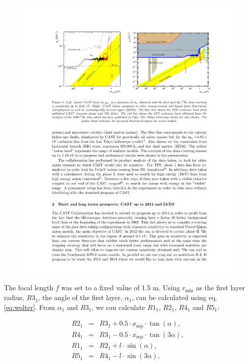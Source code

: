 \begin{figure}
\begin{minipage}{.5\textwidth}
  \centering  \includegraphics[width=\linewidth]{figures/cast/axion_search_cast.pdf}
  \label{fig:optic_and_bore}
\end{minipage}
\end{figure}

The focal length $f$ was set to a fixed value of 1.5 m. Using $r_{\text{min}}$ as the first layer radius, $\mathit{R3}_1$, the angle of the first layer, $\alpha_1$, can be calculated using eq. \ref{eq:wolter}. From $\alpha_1$ and $\mathit{R3}_1$, we can calculate $\mathit{R1}_1$, $\mathit{R2}_1$, $\mathit{R4}_1$ and $\mathit{R5}_1$:

\begin{eqnarray}
  \mathit{R2}_1 &=& \mathit{R3}_1 + 0.5 \cdot x_{\text{sep}}\cdot\tan(\alpha),\\
  \mathit{R4}_1 &=& \mathit{R3}_1 - 0.5 \cdot x_{\text{sep}}\cdot\tan(3\alpha),\\
  \mathit{R1}_1 &=& \mathit{R2}_1 + l\cdot\sin(\alpha),\\
  \mathit{R5}_1 &=& \mathit{R4}_1 - l\cdot\sin(3\alpha),
\end{eqnarray}

